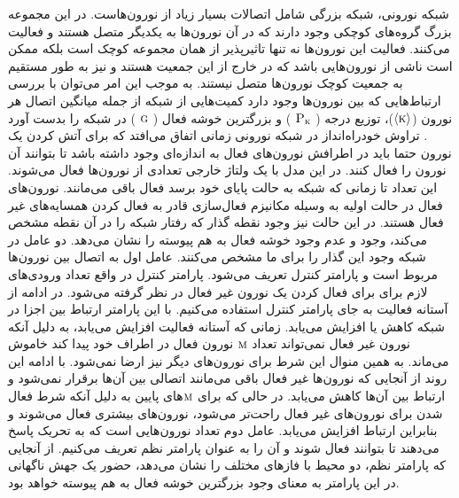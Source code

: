  شبکه نورونی، شبکه بزرگی شامل اتصالات بسیار زیاد از نورون‌هاست. در این مجموعه بزرگ گروه‌های کوچکی وجود دارند که در آن نورون‌ها به یکدیگر متصل هستند و فعالیت می‌کنند. فعالیت این نورون‌ها نه تنها تاثیرپذیر از همان مجموعه کوچک است بلکه ممکن است ناشی از نورون‌هایی باشد که در خارج از این جمعیت هستند و نیز به طور مستقیم به جمعیت کوچک نورون‌ها متصل نیستند. به موجب این امر می‌توان با بررسی ارتباط‌هایی که بین نورون‌ها وجود دارد کمیت‌هایی از شبکه از جمله میانگین اتصال هر نورون ($\left\langle \textsc{k} \right\rangle$)، توزیع درجه (
 $\textsc{P}_{\textsc{k}}$
 ) و بزرگترین خوشه فعال (
 $\textsc{g}$
 ) در شبکه را بدست آورد \cite{sori}. 
 تراوش خودراه‌انداز در شبکه‌ نورونی زمانی اتفاق می‌افتد که برای آتش کردن یک نورون حتما باید در اطرافش نورون‌های فعال به اندازه‌ای وجود داشته باشد تا بتوانند آن نورون را فعال کنند. در این مدل با یک ولتاژ خارجی تعدادی از نورون‌ها فعال می‌شوند. این تعداد تا زمانی که شبکه به حالت پایای خود برسد فعال باقی می‌مانند. نورون‌های فعال در حالت اولیه به وسیله مکانیزم فعال‌سازی قادر به فعال کردن همسایه‌های غیر فعال هستند. در این حالت نیز وجود نقطه گذار که رفتار شبکه را در آن نقطه مشخص می‌کند، وجود و عدم وجود خوشه فعال به هم پیوسته را نشان می‌دهد.
 دو عامل در شبکه وجود این گذار را برای ما مشخص می‌کنند. عامل اول به اتصال بین نورون‌ها مربوط است و پارامتر کنترل تعریف می‌شود. پارامتر کنترل در واقع تعداد ورودی‌های لازم برای برای فعال کردن یک نورون غیر فعال در نظر گرفته می‌شود. در ادامه از آستانه فعالیت به جای پارامتر کنترل استفاده می‌کنیم. با این پارامتر ارتباط بین اجزا در شبکه کاهش  یا افزایش می‌یابد. زمانی‌ که آستانه فعالیت افزایش می‌یابد، به دلیل آنکه نورون غیر فعال نمی‌تواند  تعداد 
 $\textsc{m}$ 
 نورون فعال در اطراف خود پیدا کند خاموش  می‌ماند. به همین منوال این شرط برای نورون‌های دیگر نیز ارضا نمی‌شود.  با ادامه این روند از آنجایی که نورون‌ها غیر فعال باقی می‌مانند  اتصالی بین آن‌ها برقرار نمی‌شود و ارتباط بین آن‌ها کا‌هش می‌یابد. در حالی که برای 
 $\textsc{m}$های پایین به دلیل آنکه شرط فعال شدن برای نورون‌های غیر فعال راحت‌تر می‌شود، نورون‌های بیشتری فعال می‌شوند و بنابراین ارتباط افزایش می‌یابد. عامل دوم تعداد نورون‌هایی است که به تحریک پاسخ می‌دهند تا بتوانند فعال شوند و آن را به عنوان پارامتر نظم تعریف می‌کنیم. از آنجایی که پارامتر نظم، دو محیط با فاز‌های مختلف را نشان می‌دهد، حضور یک جهش ناگهانی  در این پارامتر به معنای وجود بزرگترین خوشه فعال به هم پیوسته خواهد بود.  
 
 
